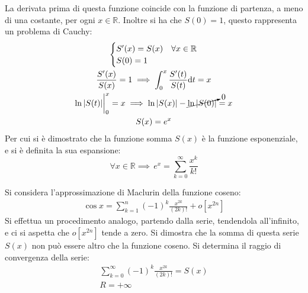 \documentclass{article}
\numberwithin{equation}{subsection}
\begin{document}
La derivata prima di questa funzione coincide con la funzione di partenza, a meno di una costante, per ogni $x\in\mathbb{R}$. Inoltre si ha che $S(0)=1$, questo rappresenta un problema di Cauchy:
\begin{gather*}
    \begin{cases}
        S'(x)=S(x)&\forall x\in\mathbb{R}\\
        S(0)=1
    \end{cases}\\
    \displaystyle\frac{S'(x)}{S(x)}=1\implies\int_0^x\frac{S'(t)}{S(t)}\mathrm{d}t=x\\
    \ln|S(t)|\bigg|_0^x=x\implies \ln|S(x)|-\cancelto{0}{\ln|S(0)|}=x\\
    S(x)=e^x
\end{gather*}
Per cui si è dimostrato che la funzione somma $S(x)$ è la funzione esponenziale, e si è definita la sua espansione:
\begin{equation}
    \forall x\in\mathbb{R}\implies\,e^x=\displaystyle\sum_{k=0}^\infty\frac{x^k}{k!}
\end{equation}

Si considera l'approssimazione di Maclurin della funzione coseno:
\begin{gather*}
    \cos x=\displaystyle\sum_{k=1}^n(-1)^k\frac{x^{2k}}{(2k)!}+o[x^{2n}]
\end{gather*}
Si effettua un procedimento analogo, partendo dalla serie, tendendola all'infinito, e ci si aspetta che $o[x^{2n}]$ tende a zero. Si dimostra che la somma di questa serie $S(x)$ non può essere altro che la funzione coseno. 
Si determina il raggio di convergenza della serie:
\begin{gather*}
    \displaystyle\sum_{k=0}^\infty(-1)^k\frac{x^{2k}}{(2k)!}=S(x)\\
    R=+\infty
\end{gather*}
\end{document}
